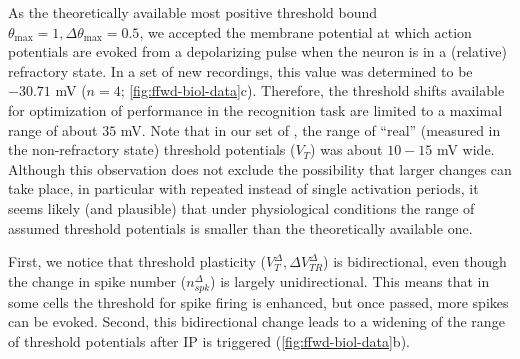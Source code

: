 As the theoretically available most positive threshold bound
        $\theta_{\mathrm{max}} = 1, \Delta \theta_{\mathrm{max}} = 0.5$,
        we accepted the membrane potential at which action potentials are evoked
            from a depolarizing pulse when the neuron is in a (relative) refractory state.
    In a set of new recordings, this value was determined to be $-30.71$ mV
        ($n=4$; \autoref{fig:ffwd-biol-data}c).
    Therefore, the threshold shifts available for optimization of performance in the recognition task
        are limited to a maximal range of about $35$ mV.
    Note that in our set of
        ,
        the range of ``real'' (measured in the non-refractory state) threshold potentials ($V_T$) was about $10-15$ mV wide.
    Although this observation does not exclude the possibility that larger changes can take place,
        in particular with repeated instead of single activation periods,
        it seems likely (and plausible) that under physiological conditions
            the range of assumed threshold potentials
            is smaller than the theoretically available one.

    First, we notice that threshold plasticity ($V_T^{\Delta}, \Delta V_{TR}^{\Delta}$) is bidirectional,
        even though the change in spike number ($n_{spk}^{\Delta}$) is largely unidirectional.
    This means that in some cells the threshold for spike firing is enhanced,
        but once passed, more spikes can be evoked.
    Second, this bidirectional change leads to a widening of the range of threshold potentials
        after IP is triggered (\autoref{fig:ffwd-biol-data}b).

